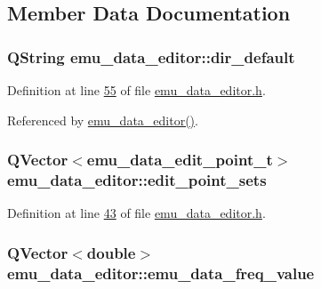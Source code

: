\subsection{Member Data Documentation}
\hypertarget{a00004_aa55b7d8008e31fcc971692b493e7cf34}{
\subsubsection[{dir\+\_\+default}]{\setlength{\rightskip}{0pt plus 5cm}Q\+String emu\+\_\+data\+\_\+editor\+::dir\+\_\+default}}\label{a00004_aa55b7d8008e31fcc971692b493e7cf34}


Definition at line \hyperlink{a00036_source_l00055}{55} of file \hyperlink{a00036_source}{emu\+\_\+data\+\_\+editor.\+h}.



Referenced by \hyperlink{a00035_source_l00012}{emu\+\_\+data\+\_\+editor()}.

\hypertarget{a00004_ab093b86d07b4eb96c36878089a7d97df}{
\subsubsection[{edit\+\_\+point\+\_\+sets}]{\setlength{\rightskip}{0pt plus 5cm}Q\+Vector$<${\bf emu\+\_\+data\+\_\+edit\+\_\+point\+\_\+t}$>$ emu\+\_\+data\+\_\+editor\+::edit\+\_\+point\+\_\+sets}}\label{a00004_ab093b86d07b4eb96c36878089a7d97df}


Definition at line \hyperlink{a00036_source_l00043}{43} of file \hyperlink{a00036_source}{emu\+\_\+data\+\_\+editor.\+h}.

\hypertarget{a00004_a62129d59e218ab857cd50cb202205129}{
\subsubsection[{emu\+\_\+data\+\_\+freq\+\_\+value}]{\setlength{\rightskip}{0pt plus 5cm}Q\+Vector$<$double$>$ emu\+\_\+data\+\_\+editor\+::emu\+\_\+data\+\_\+freq\+\_\+value}}\label{a00004_a62129d59e218ab857cd50cb202205129}


